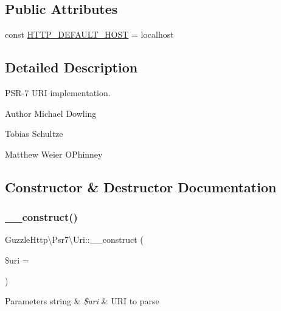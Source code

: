 \subsection*{Public Attributes}
\begin{DoxyCompactItemize}
\item 
const \hyperlink{classGuzzleHttp_1_1Psr7_1_1Uri_adb73484280030402f9f37dd060245170}{H\+T\+T\+P\+\_\+\+D\+E\+F\+A\+U\+L\+T\+\_\+\+H\+O\+ST} = \textquotesingle{}localhost\textquotesingle{}
\end{DoxyCompactItemize}


\subsection{Detailed Description}
P\+S\+R-\/7 U\+RI implementation.

\begin{DoxyAuthor}{Author}
Michael Dowling 

Tobias Schultze 

Matthew Weier O\textquotesingle{}Phinney 
\end{DoxyAuthor}


\subsection{Constructor \& Destructor Documentation}
\mbox{\label{classGuzzleHttp_1_1Psr7_1_1Uri_a4b906efba58c4af89b5aa48a13d41103}} 
\subsubsection{\texorpdfstring{\+\_\+\+\_\+construct()}{\_\_construct()}}
{\footnotesize\ttfamily Guzzle\+Http\textbackslash{}\+Psr7\textbackslash{}\+Uri\+::\+\_\+\+\_\+construct (\begin{DoxyParamCaption}\item[{}]{\$uri = {\ttfamily \textquotesingle{}\textquotesingle{}} }\end{DoxyParamCaption})}


\begin{DoxyParams}[1]{Parameters}
string & {\em \$uri} & U\+RI to parse \\
\hline
\end{DoxyParams}



